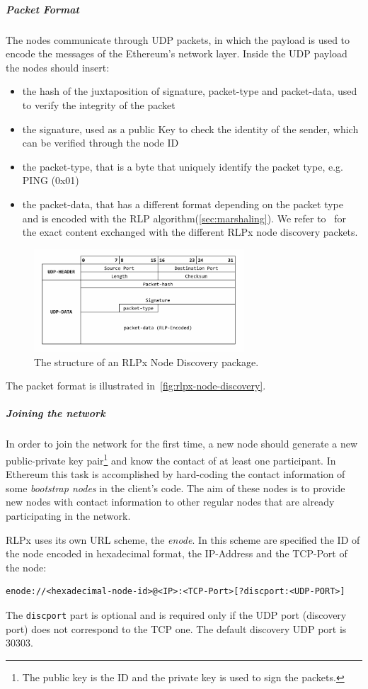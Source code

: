 \subparagraph{Packet Format}
The nodes communicate through UDP packets, in which the payload is used to
encode the messages of the Ethereum's network layer. Inside the UDP payload the
nodes should insert:
\begin{itemize}
    \item the hash of the juxtaposition of signature, packet-type and
    packet-data, used to verify the integrity of the packet
    \item the signature, used as a public Key to check the identity of the
    sender, which can be verified through the node ID
    \item the packet-type, that is a byte that uniquely identify the packet
    type, e.g. PING (0x01)
    \item the packet-data, that has a different format depending on the packet
    type and is encoded with the RLP algorithm(\autoref{sec:marshaling}).
    We refer to~\cite{bib:rlpx-discovery-protocol} for the exact content
    exchanged with the different RLPx node discovery packets.
\end{itemize}
\begin{figure}
    \begin{center}
    \includegraphics[width=0.7\textwidth]{./res/img/rlp-node-discovery-packet-format.pdf}
    \caption{The structure of an RLPx Node Discovery package.}
    \label{fig:rlpx-node-discovery}
    \end{center}
\end{figure}

The packet format is illustrated in~\autoref{fig:rlpx-node-discovery}.




\subparagraph{Joining the network}
In order to join the network for the first time, a new node should generate a
new public-private key pair\footnote{The public key is the ID and the private
key is used to sign the packets.} and know the contact of at least one
participant. In Ethereum this task is accomplished by hard-coding the contact
information of some \textit{bootstrap nodes} in the client's code. The aim of
these nodes is to provide new nodes with contact information to other regular
nodes that are already participating in the network.

RLPx uses its own URL scheme, the \emph{enode}. In this scheme are specified
the ID
of the node encoded in hexadecimal format, the IP-Address and the TCP-Port of
the node:
\begin{verbatim}
enode://<hexadecimal-node-id>@<IP>:<TCP-Port>[?discport:<UDP-PORT>]
\end{verbatim}
The \verb|discport| part is optional and is required only if the UDP port
(discovery port) does not correspond to the TCP one. The default discovery UDP
port is 30303.

